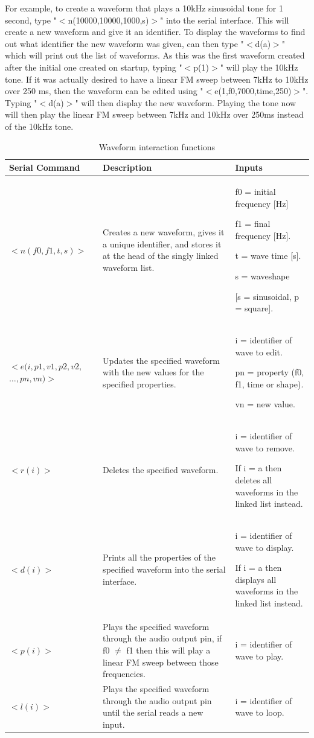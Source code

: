 \documentclass[12pt, a4paper]{article}
\begin{document}
For example, to create a waveform that plays a 10kHz sinusoidal tone for 1 second, type "$<$n(10000,10000,1000,s)$>$" into the serial interface. This will create a new waveform and give it an identifier. To display the waveforms to find out what identifier the new waveform was given, can then type "$<$d(a)$>$" which will print out the list of waveforms. As this was the first waveform created after the initial one created on startup, typing "$<$p(1)$>$" will play the 10kHz tone. If it was actually desired to have a linear FM sweep between 7kHz to 10kHz over 250 ms, then the waveform can be edited using "$<$e(1,f0,7000,time,250)$>$". Typing "$<$d(a)$>$" will then display the new waveform. Playing the tone now will then play the linear FM sweep between 7kHz and 10kHz over 250ms instead of the 10kHz tone. \\
\begin{table} [!htb]
	\caption{Waveform interaction functions}
	\label{tab:L_waveformInteractions}
	\centering
	\begin{tabular}{ |m{}|m{}|m{}| } 
		\hline
		Serial Command & Description & Inputs \\ 
		\hline
		\hline
		\centering $<n(f0,f1,t,s)>$ & Creates a new waveform, gives it a unique identifier, and stores it at the head of the singly linked waveform list. & f0 = initial frequency [Hz]
		
		f1 = final frequency [Hz].
		 
		t = wave time [s].

		s = waveshape 
		
		[s = sinusoidal, p = square]. \\
		
		\hline
		\centering$<e(i,p1,v1,p2,v2,$
		\centering$…,pn,vn)>$ & Updates the specified waveform with the new values for the specified properties. & i = identifier of wave to edit.
		
		pn = property (f0, f1, time or shape).
		
		vn = new value. \\
		
		\hline
		\centering$<r(i)>$ & Deletes the specified waveform. & i = identifier of wave to remove.
		
		If i = a then deletes all waveforms in the linked list instead. \\
		\hline
		\centering$<d(i)>$ & Prints all the properties of the specified waveform into the serial interface. & i = identifier of wave to display.
		
		If i = a then displays all waveforms in the linked list instead.\\
		\hline
		\centering$<p(i)>$ & Plays the specified waveform through the audio output pin, 
		if f0 $\neq$ f1 then this will play a linear FM sweep between those frequencies. & i = identifier of wave to play. \\
		
		\hline
		\centering$<l(i)>$ & Plays the specified waveform through the audio output pin until the serial reads a new input. & i = identifier of wave to loop. \\
		\hline		
	\end{tabular}
\end{table}
\end{document}
